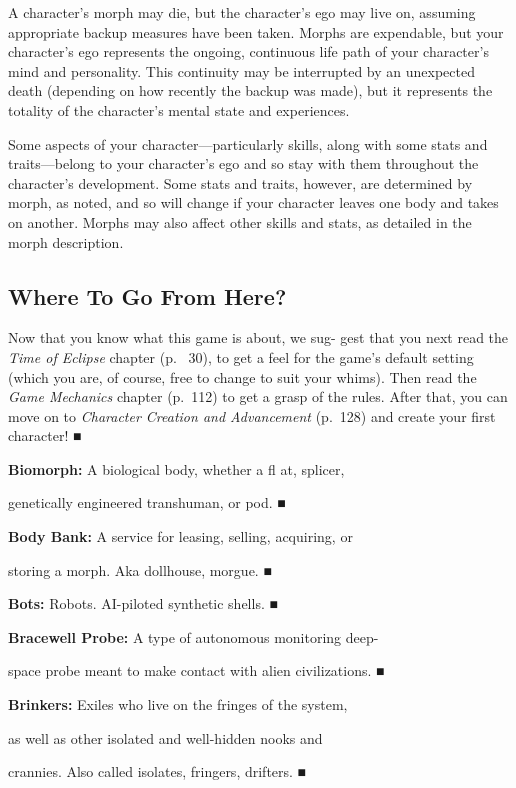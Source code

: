 A character's morph may die, but the character's 
ego may live on, assuming appropriate backup 
measures have been taken. Morphs are expendable, 
but your character's ego represents the ongoing, 
continuous life path of your character's mind and 
personality. This continuity may be interrupted by 
an unexpected death (depending on how recently 
the backup was made), but it represents the totality 
of the character's mental state and experiences.

Some aspects of your character—particularly skills, 
along with some stats and traits—belong to your 
character's ego and so stay with them throughout 
the character's development. Some stats and traits, 
however, are determined by morph, as noted, and so 
will change if your character leaves one body and 
takes on another. Morphs may also affect other skills 
and stats, as detailed in the morph description.

\subsection{Where To Go From Here?}

Now that you know what this game is about, we sug-
gest that you next read the \textit{Time of Eclipse} chapter 
(p.  30), to get a feel for the game's default setting 
(which you are, of course, free to change to suit your 
whims). Then read the \textit{Game Mechanics} chapter 
(p. 112) to get a grasp of the rules. After that, you 
can move on to \textit{Character Creation and Advancement}
(p. 128) and create your first character!
■

\textbf{ Biomorph:} A biological body, whether a ﬂ at, splicer, 

genetically engineered transhuman, or pod.
■

\textbf{ Body Bank:} A service for leasing, selling, acquiring, or 

storing a morph. Aka dollhouse, morgue.
■

\textbf{ Bots:} Robots. AI-piloted synthetic shells.
■

\textbf{ Bracewell Probe:} A type of autonomous monitoring deep-

space probe meant to make contact with alien civilizations.
■

\textbf{ Brinkers:} Exiles who live on the fringes of the system, 

as well as other isolated and well-hidden nooks and 

crannies. Also called isolates, fringers, drifters.
■

